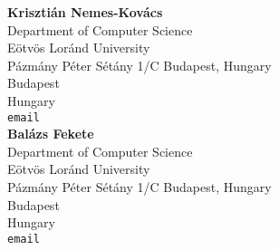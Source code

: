 \documentclass[10pt,leqno,twoside]{article}
\begin{document}
\noindent\textbf{Krisztián Nemes-Kovács}\\
Department of Computer Science\\Eötvös Loránd University\\Pázmány Péter Sétány 1/C Budapest, Hungary\\
Budapest\\
Hungary\\
{\tt email}\\

\noindent\textbf{Balázs Fekete}\\
Department of Computer Science\\Eötvös Loránd University\\Pázmány Péter Sétány 1/C Budapest, Hungary\\
Budapest\\
Hungary\\
{\tt email}\\
\end{document}
